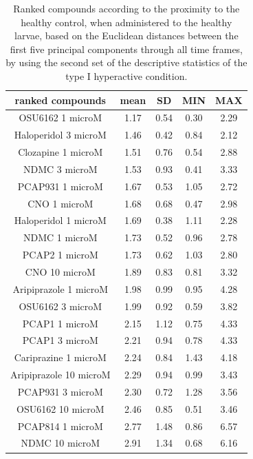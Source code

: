 \begin{table}[h!]\tiny
\centering
\caption{Ranked compounds according to the proximity to the healthy control, when administered to the healthy larvae, based on the Euclidean distances between the first five principal components through all time frames, by using the second set of the descriptive statistics of the type I hyperactive condition.}
\begin{tabular}{|c|c|c|c|c|}
\hline
ranked compounds             & mean & SD   & MIN  & MAX   \\ \hline
OSU6162 1 microM       & 1.17 & 0.54 & 0.30  & 2.29  \\ \hline
Haloperidol 3 microM   & 1.46 & 0.42 & 0.84 & 2.12  \\ \hline
Clozapine 1 microM     & 1.51 & 0.76 & 0.54 & 2.88  \\ \hline
NDMC 3 microM          & 1.53 & 0.93 & 0.41 & 3.33  \\ \hline
PCAP931 1 microM       & 1.67 & 0.53 & 1.05 & 2.72  \\ \hline
CNO 1 microM           & 1.68 & 0.68 & 0.47 & 2.98  \\ \hline
Haloperidol 1 microM   & 1.69 & 0.38 & 1.11 & 2.28  \\ \hline
NDMC 1 microM          & 1.73 & 0.52 & 0.96 & 2.78  \\ \hline
PCAP2 1 microM         & 1.73 & 0.62 & 1.03 & 2.80   \\ \hline
CNO 10 microM          & 1.89 & 0.83 & 0.81 & 3.32  \\ \hline
Aripiprazole 1 microM  & 1.98 & 0.99 & 0.95 & 4.28  \\ \hline
OSU6162 3 microM       & 1.99 & 0.92 & 0.59 & 3.82  \\ \hline
PCAP1 1 microM         & 2.15 & 1.12 & 0.75 & 4.33  \\ \hline
PCAP1 3 microM         & 2.21 & 0.94 & 0.78 & 4.33  \\ \hline
Cariprazine 1 microM   & 2.24 & 0.84 & 1.43 & 4.18  \\ \hline
Aripiprazole 10 microM & 2.29 & 0.94 & 0.99 & 3.43  \\ \hline
PCAP931 3 microM       & 2.30  & 0.72 & 1.28 & 3.56  \\ \hline
OSU6162 10 microM      & 2.46 & 0.85 & 0.51 & 3.46  \\ \hline
PCAP814 1 microM       & 2.77 & 1.48 & 0.86 & 6.57  \\ \hline
NDMC 10 microM         & 2.91 & 1.34 & 0.68 & 6.16  \\ \hline

\end{tabular}
\end{table}
